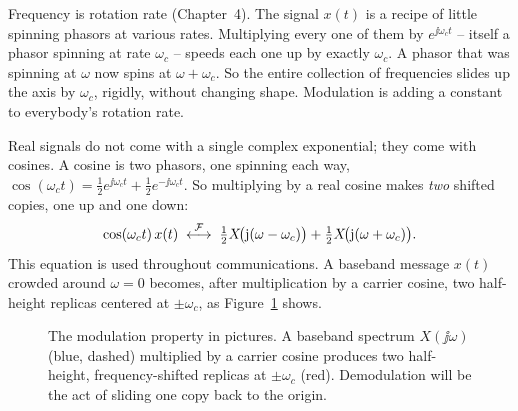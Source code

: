 \begin{intuitionbox}
Frequency is rotation rate (Chapter~4). The signal $x(t)$ is a
recipe of little spinning phasors at various rates. Multiplying every one of them by
$e^{\jj\omega_c t}$ -- itself a phasor spinning at rate $\omega_c$ -- speeds each one up
by exactly $\omega_c$. A phasor that was spinning at $\omega$ now spins at
$\omega+\omega_c$. So the entire collection of frequencies slides up the axis by
$\omega_c$, rigidly, without changing shape. Modulation is adding a constant
to everybody's rotation rate.
\end{intuitionbox}

Real signals do not come with a single complex exponential; they come with cosines.
A cosine is two phasors, one spinning each way, $\cos(\omega_c t) = \tfrac12 e^{\jj\omega_c
t} + \tfrac12 e^{-\jj\omega_c t}$. So multiplying by a real cosine makes \emph{two}
shifted copies, one up and one down:
\begin{equation}
\label{ch23:cosmod}
\cos(\omega_c t)\,x(t)
\;\overset{\mathcal{F}}{\longleftrightarrow}\;
\tfrac12 X\!\big(\mathrm{j}(\omega-\omega_c)\big) + \tfrac12 X\!\big(\mathrm{j}(\omega+\omega_c)\big).
\end{equation}
This equation is used throughout communications. A baseband message $x(t)$
crowded around $\omega = 0$ becomes, after multiplication by a carrier cosine, two
half-height replicas centered at $\pm\omega_c$, as
Figure~\ref{ch23:fig-split} shows.

\begin{figure}[H]
\centering
{}
\caption{The modulation property in pictures. A baseband spectrum $X(\jj\omega)$ (blue,
dashed) multiplied by a carrier cosine produces two half-height, frequency-shifted
replicas at $\pm\omega_c$ (red). Demodulation will be the act of sliding one copy back
to the origin.}
\label{ch23:fig-split}
\end{figure}


